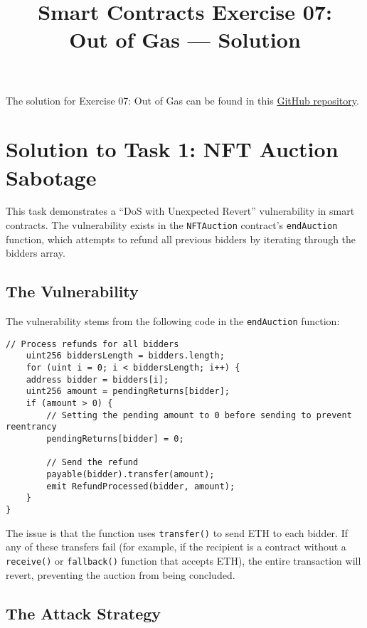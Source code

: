 \documentclass[12pt]{article}
\title{Smart Contracts Exercise 07: \\ Out of Gas --- Solution}
\author{}
\date{}
\begin{document}
\maketitle

\noindent
The solution for Exercise 07: Out of Gas can be found in this \href{https://github.com/radovluk/Smart-Contract-Exercise/tree/main/07-Out-of-Gas/solution/solution-code}{GitHub repository}.

\section*{Solution to Task 1: NFT Auction Sabotage}

This task demonstrates a ``DoS with Unexpected Revert'' vulnerability in smart contracts. The vulnerability exists in the \texttt{NFTAuction} contract's \texttt{endAuction} function, which attempts to refund all previous bidders by iterating through the bidders array. 

\subsection*{The Vulnerability}

The vulnerability stems from the following code in the \texttt{endAuction} function:

\noindent
\begin{minipage}{\textwidth}
\begin{lstlisting}[language=Solidity]
    // Process refunds for all bidders
    uint256 biddersLength = bidders.length;
    for (uint i = 0; i < biddersLength; i++) {
    address bidder = bidders[i];
    uint256 amount = pendingReturns[bidder];
    if (amount > 0) {
        // Setting the pending amount to 0 before sending to prevent reentrancy
        pendingReturns[bidder] = 0;

        // Send the refund
        payable(bidder).transfer(amount);
        emit RefundProcessed(bidder, amount);
    }
}
\end{lstlisting}
\end{minipage}

The issue is that the function uses \texttt{transfer()} to send ETH to each bidder. If any of these transfers fail (for example, if the recipient is a contract without a \texttt{receive()} or \texttt{fallback()} function that accepts ETH), the entire transaction will revert, preventing the auction from being concluded.

\subsection*{The Attack Strategy}
\end{document}
